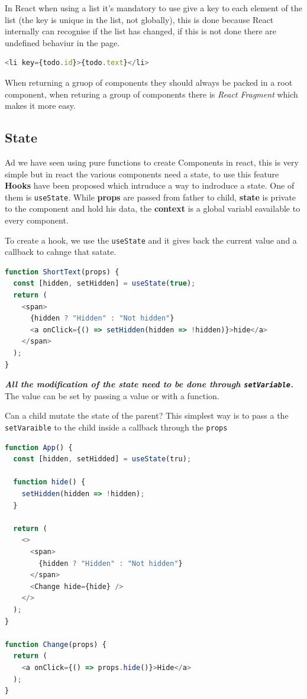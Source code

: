 \documentclass[12pt]{article}
\begin{document}
In React when using a list it's mandatory to use give a key to each element of the list (the key is unique in the list, not globally), this is done because React internally can recognise if the list has changed, if this is not done there are undefined behaviur in the page.
\begin{lstlisting}[language=js]
<li key={todo.id}>{todo.text}</li>
\end{lstlisting}
When returning a gruop of components they should always be packed in a root component, when returing a  group of components there is \emph{React Fragment} which makes it more easy.


\subsection{State}
Ad we have seen using pure functions to create Components in react, this is very simple but in react the various components need a state, to use this feature \textbf{Hooks} have been proposed which intruduce a way to indroduce a state. One of them is \texttt{useState}. While \textbf{props} are passed from father to child, \textbf{state} is private to the component and hold his data, the \textbf{context} is a global variabl eavailable to every component.

To create a hook, we use the \texttt{useState} and it gives back the current value and a callback to cahnge that satate.
\begin{lstlisting}[language=js]
function ShortText(props) {
  const [hidden, setHidden] = useState(true);
  return (
    <span>
      {hidden ? "Hidden" : "Not hidden"}
      <a onClick={() => setHidden(hidden => !hidden)}>hide</a>
    </span>
  );
}
\end{lstlisting}
\emph{\textbf{All the modification of the state need to be done through \texttt{setVariable}.}} The value can be set by passing a value or with a function.

Can a child mutate the state of the parent? This simplest way is to pass a the \texttt{setVaraible} to the child inside a callback through the \texttt{props}
\begin{lstlisting}[language=js]
function App() {
  const [hidden, setHidded] = useState(tru);

  function hide() {
    setHidden(hidden => !hidden);
  }

  return (
    <>
      <span>
        {hidden ? "Hidden" : "Not hidden"}
      </span>
      <Change hide={hide} />
    </>
  );
}

function Change(props) {
  return (
    <a onClick={() => props.hide()}>Hide</a>
  );
}
\end{lstlisting}
\end{document}
